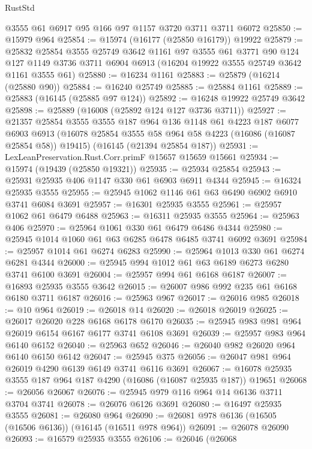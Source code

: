 \begin{lexlean}{RustStd}
\begin{coremodule}
    @3555
    @61
    @6917
    @95
    @166
    @97
    @1157
    @3720
    @3711
    @3711
    @6072
@25850 := @15979 @964
@25854 := @15974 (@16177 (@25850 @16179)) @19922
@25879 := @25832
    @25854
    @3555
    @25749
    @3642
    @1161
    @97
    @3555
    @61
    @3771
    @90
    @124
    @127
    @1149
    @3736
    @3711
    @6904
    @6913
    (@16204 @19922 @3555 @25749 @3642 @1161 @3555 @61)
@25880 := @16234 @1161
@25883 := @25879 (@16214 (@25880 @90))
@25884 := @16240 @25749
@25885 := @25884 @1161
@25889 := @25883 (@16145 (@25885 @97 @124))
@25892 := @16248 @19922 @25749 @3642
@25898 := @25889 (@16008 (@25892 @124 @127 @3736 @3711))
@25927 := @21357
    @25854
    @3555
    @3555
    @187
    @964
    @136
    @1148
    @61
    @4223
    @187
    @6077
    @6903
    @6913
    (@16078 @25854 @3555 @58 @964 @58 @4223 (@16086 (@16087 @25854 @58)) @19415)
    (@16145 (@21394 @25854 @187))
@25931 := LexLeanPreservation.Rust.Corr.primF @15657 @15659 @15661
@25934 := @15974 (@19439 (@25850 @19321))
@25935 := @25934 @25854
@25943 := @25931 @25935 @406 @1147 @330 @61 @6903 @6911 @4344
@25945 := @16324 @25935 @3555
@25955 := @25945 @1062 @1146 @61 @63 @6490 @6902 @6910 @3741 @6084 @3691
@25957 := @16301 @25935 @3555
@25961 := @25957 @1062 @61 @6479 @6488
@25963 := @16311 @25935 @3555
@25964 := @25963 @406
@25970 := @25964 @1061 @330 @61 @6479 @6486 @4344
@25980 := @25945 @1014 @1060 @61 @63 @6285 @6478 @6485 @3741 @6092 @3691
@25984 := @25957 @1014 @61 @6274 @6283
@25990 := @25964 @1013 @330 @61 @6274 @6281 @4344
@26000 := @25945 @994 @1012 @61 @63 @6189 @6273 @6280 @3741 @6100 @3691
@26004 := @25957 @994 @61 @6168 @6187
@26007 := @16893 @25935 @3555 @3642
@26015 := @26007 @986 @992 @235 @61 @6168 @6180 @3711 @6187
@26016 := @25963 @967
@26017 := @26016 @985
@26018 := @10 @964
@26019 := @26018 @14
@26020 := @26018 @26019
@26025 := @26017 @26020 @228 @6168 @6178 @6170
@26035 := @25945 @983 @981 @964 @26019 @6154 @6167 @6177 @3741 @6108 @3691
@26039 := @25957 @983 @964 @6140 @6152
@26040 := @25963 @652
@26046 := @26040 @982 @26020 @964 @6140 @6150 @6142
@26047 := @25945 @375
@26056 := @26047 @981 @964 @26019 @4290 @6139 @6149 @3741 @6116 @3691
@26067 := @16078 @25935 @3555 @187 @964 @187 @4290 (@16086 (@16087 @25935 @187)) @19651
@26068 := @26056 @26067
@26076 := @25945 @979 @116 @964 @14 @6136 @3711 @3704 @3741
@26078 := @26076 @6126 @3691
@26080 := @16497 @25935 @3555
@26081 := @26080 @964
@26090 := @26081 @978 @6136 (@16505 (@16506 @6136)) (@16145 (@16511 @978 @964))
@26091 := @26078 @26090
@26093 := @16579 @25935 @3555
@26106 := @26046
    (@26068

\end{coremodule}
\end{lexlean}
